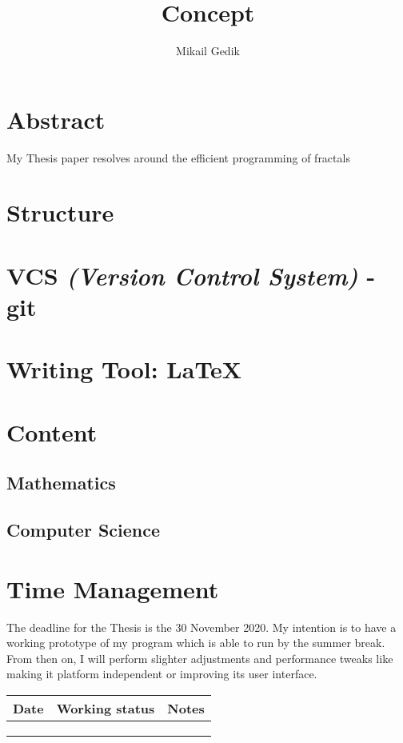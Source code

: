 \documentclass[10pt,a4paper]{article}
\title{Concept}
\author{Mikail Gedik}
\begin{document}
	\maketitle
	\tableofcontents
	\newpage
	\section{Abstract}
	My Thesis paper resolves around the efficient programming of fractals
	\section{Structure}
	\section{VCS \textit{(Version Control System)} - git}
	\section{Writing Tool: \LaTeX}
	\section{Content}
	\subsection{Mathematics}
	\subsection{Computer Science}
	\section{Time Management}
	The deadline for the Thesis is the 30 November 2020. My intention is to have a working prototype of my program which is able to run by the summer break. From then on, I will perform slighter adjustments and performance tweaks like making it platform independent or improving its user interface.
	
	\begin{table}[h]
		\centering
		\begin{tabular}{|l|l|l|}
			\hline
			Date & Working status & Notes \\ \hline
			&                &       \\ \hline
			&                &       \\ \hline
			&                &       \\ \hline
		\end{tabular}
	\end{table}
\end{document}
